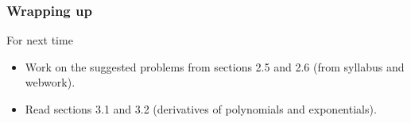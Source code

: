 \documentclass[leqno]{beamer}
\theoremstyle{definition}
\theoremstyle{remark}
\begin{document}





\begin{frame}

\frametitle{Wrapping up}
For next time
\begin{itemize}
\item Work on the suggested problems from sections 2.5 and 2.6  (from syllabus and webwork).
\item Read sections 3.1 and 3.2 (derivatives of polynomials and exponentials).
\end{itemize}

\end{frame}
\end{document}
